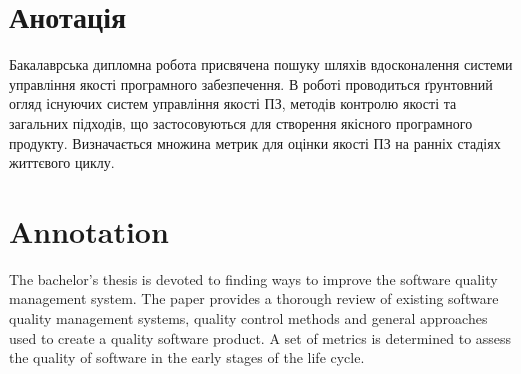 \frontmatter
\chapter*{Анотація}%

Бакалаврська дипломна робота присвячена пошуку шляхів вдосконалення системи управління якості програмного забезпечення. В роботі проводиться ґрунтовний огляд існуючих систем управління якості ПЗ, методів контролю якості та загальних підходів, що застосовуються для створення якісного програмного продукту. Визначається множина метрик для оцінки якості ПЗ на ранніх стадіях життєвого циклу.

\chapter*{Annotation}

The bachelor's thesis is devoted to finding ways to improve the software quality management system. The paper provides a thorough review of existing software quality management systems, quality control methods and general approaches used to create a quality software product. A set of metrics is determined to assess the quality of software in the early stages of the life cycle.

\mainmatter
\newpage